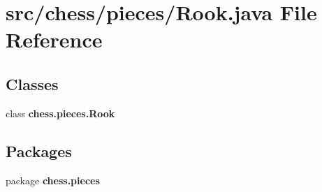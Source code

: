 \section{src/chess/pieces/\+Rook.java File Reference}
\label{_rook_8java}
\subsection*{Classes}
\begin{DoxyCompactItemize}
\item 
class {\bf chess.\+pieces.\+Rook}
\end{DoxyCompactItemize}
\subsection*{Packages}
\begin{DoxyCompactItemize}
\item 
package {\bf chess.\+pieces}
\end{DoxyCompactItemize}
